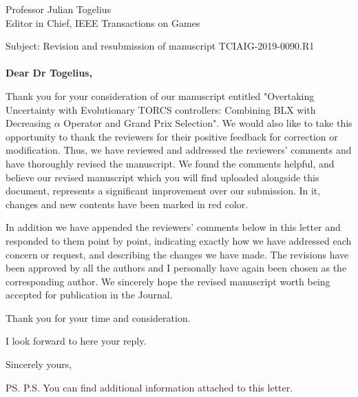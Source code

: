 \documentclass[10pt]{letter} %
\begin{document}

\begin{letter}{Professor Julian Togelius \\ Editor in Chief, IEEE Transactions on Games} %

\opening{Subject: Revision and resubmission of manuscript TCIAIG-2019-0090.R1\\
	\\	
\textbf{Dear Dr Togelius,}}

Thank you for your consideration of our manuscript entitled "Overtaking Uncertainty with Evolutionary TORCS controllers: Combining BLX with Decreasing $\alpha$ Operator and Grand Prix Selection". 
We would also like to take this opportunity to thank the reviewers for their positive feedback for correction or modification. Thus, we have reviewed and addressed the reviewers' comments and have thoroughly revised the manuscript. We found the comments helpful, and believe our revised manuscript which you will find uploaded alongside this document, represents a significant improvement over our submission. In it, changes and new contents have been marked in red color.

In addition we have appended the reviewers' comments below in this letter and responded to them point by point, indicating exactly how we have addressed each concern or request, and describing the changes we have made. The revisions have been approved by all the authors and I personally have again been chosen as the corresponding author. 
We sincerely hope the revised manuscript worth being accepted for publication in the Journal.

Thank you for your time and consideration.

I look forward to here your reply.

\vspace{2\parskip} %
\closing{Sincerely yours,}
\vspace{2\parskip} %

\ps{P.S. You can find additional information attached to this letter.} %








\end{letter}
\end{document}
